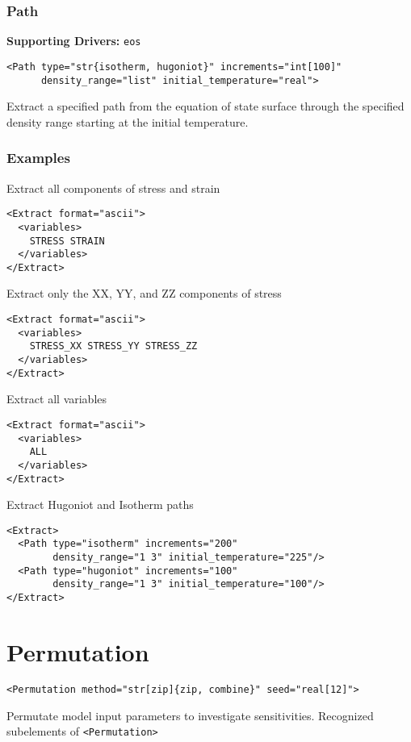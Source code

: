 \documentclass[11pt]{report}
\newcommand{\tag}[1]{\texttt{<#1>}}
\newcommand{\supporting}[1]{\textbf{Supporting Drivers: }\texttt{#1}}
\begin{document}
\subsubsection{Path}
\supporting{eos}
\begin{verbatim}
<Path type="str{isotherm, hugoniot}" increments="int[100]"
      density_range="list" initial_temperature="real">
\end{verbatim}
%
Extract a specified path from the equation of state surface through the
specified density range starting at the initial temperature.

\subsubsection{Examples}
Extract all components of stress and strain
%
\begin{verbatim}
<Extract format="ascii">
  <variables>
    STRESS STRAIN
  </variables>
</Extract>
\end{verbatim}

Extract only the XX, YY, and ZZ components of stress
%
\begin{verbatim}
<Extract format="ascii">
  <variables>
    STRESS_XX STRESS_YY STRESS_ZZ
  </variables>
</Extract>
\end{verbatim}

Extract all variables
\begin{verbatim}
<Extract format="ascii">
  <variables>
    ALL
  </variables>
</Extract>
\end{verbatim}

Extract Hugoniot and Isotherm paths
\begin{verbatim}
<Extract>
  <Path type="isotherm" increments="200"
        density_range="1 3" initial_temperature="225"/>
  <Path type="hugoniot" increments="100"
        density_range="1 3" initial_temperature="100"/>
</Extract>
\end{verbatim}

\section{Permutation}
\begin{verbatim}
<Permutation method="str[zip]{zip, combine}" seed="real[12]">
\end{verbatim}
%
Permutate model input parameters to investigate sensitivities. Recognized
subelements of \tag{Permutation}
\end{document}

